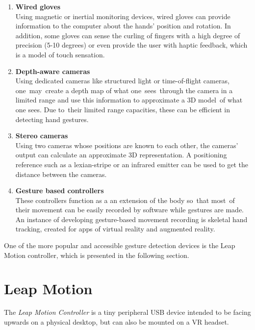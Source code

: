 \documentclass[12pt,a4paper,twoside]{report}
\begin{document}
\begin{enumerate}
  \item \textbf{Wired gloves} \\
    Using magnetic or inertial monitoring devices, wired gloves can provide information to the computer about the hands' position and rotation. In addition, some gloves can sense the curling of fingers with a high degree of precision (5-10 degrees) or even provide the user with haptic feedback, which is a model of touch sensation.
  \item \textbf{Depth-aware cameras} \\
    Using dedicated cameras like structured light or time-of-flight cameras, one may create a depth map of what one sees through the camera in a limited range and use this information to approximate a 3D model of what one sees. Due to their limited range capacities, these can be efficient in detecting hand gestures.
  \item \textbf{Stereo cameras} \\
    Using two cameras whose positions are known to each other, the cameras' output can calculate an approximate 3D representation. A positioning reference such as a lexian-stripe or an infrared emitter can be used to get the distance between the cameras.
  \item \textbf{Gesture based controllers} \\
    These controllers function as a an extension of the body so that most of their movement can be easily recorded by software while gestures are made. An instance of developing gesture-based movement recording is skeletal hand tracking, created for apps of virtual reality and augmented reality.
\end{enumerate}

One of the more popular and accessible gesture detection devices is the Leap Motion controller, which is presented in the following section. 

\section{Leap Motion}

The \textit{Leap Motion Controller} is a tiny peripheral USB device intended to be facing upwards on a physical desktop, but can also be mounted on a VR headset.
\end{document}
